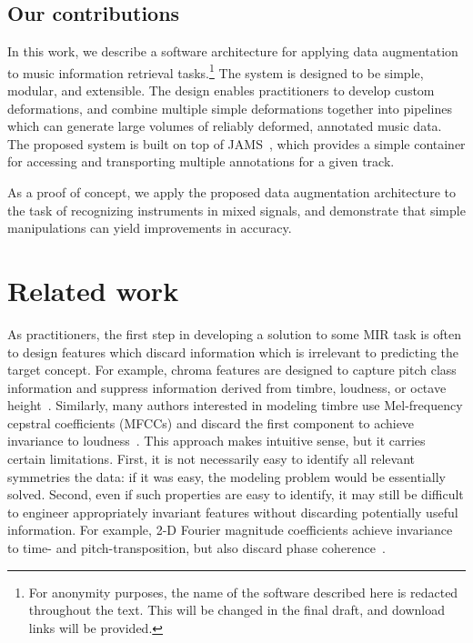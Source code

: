\documentclass{article}
\begin{document}
\subsection{Our contributions}
In this work, we describe a software architecture for applying data augmentation to music
information retrieval tasks.\footnote{For anonymity purposes, the name of the software
    described here is redacted throughout the text.  This will be changed in the final
draft, and download links will be provided.}
The system is designed to be simple, modular, and
extensible. The design enables practitioners to develop custom deformations, and combine 
multiple simple deformations together into pipelines which can generate large volumes of 
reliably deformed, annotated music data.  The proposed system is built on top of
JAMS~\cite{humphreyjams}, which provides a simple container for accessing and
transporting multiple annotations for a given track.  

As a proof of concept, we apply the proposed data augmentation architecture to the
task of recognizing instruments in mixed signals, and demonstrate that simple
manipulations can yield improvements in accuracy.

\section{Related work}

As practitioners, the first step in developing a solution to some MIR task is often to 
design features which discard information which is irrelevant to predicting the target
concept.  For example, chroma features are designed to capture pitch class information
and suppress information derived from timbre, loudness, or octave 
height~\cite{muller2011chroma}.  Similarly, many authors interested in modeling timbre
use Mel-frequency cepstral coefficients (MFCCs) and discard the first component to
achieve invariance to loudness~\cite{pampalk2004matlab}.
This approach makes intuitive sense, but it carries certain limitations.
First, it is not necessarily easy to identify all relevant symmetries the
data: if it was easy, the modeling problem would be essentially solved.  
Second, even if such properties are easy to identify, it may still be difficult to
engineer appropriately invariant features without discarding potentially useful
information.  For example, 2-D Fourier magnitude coefficients achieve invariance to 
time- and pitch-transposition, but also discard phase coherence~\cite{ellis2012large}.
\end{document}

